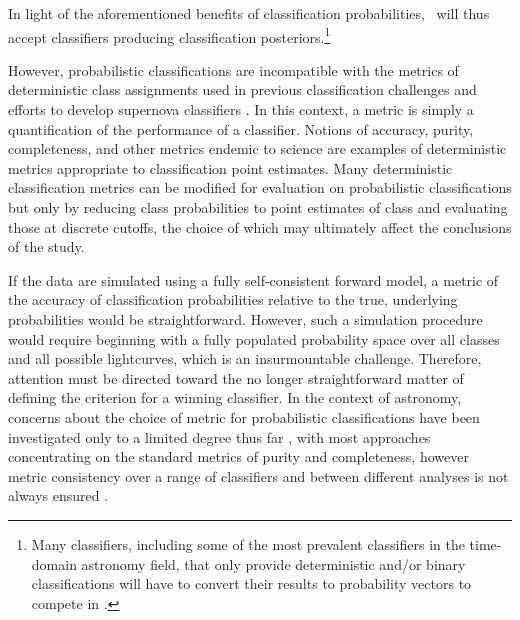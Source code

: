 In light of the aforementioned benefits of classification probabilities, \plasticc\ will thus accept classifiers producing classification posteriors.\footnote{Many classifiers, including some of the most prevalent classifiers in the time-domain astronomy field, that only provide deterministic and/or binary classifications will have to convert their results to probability vectors to compete in \plasticc.}

However, probabilistic classifications are incompatible with the metrics of deterministic class assignments used in previous classification challenges \citep{kessler_supernova_2010, kessler_results_2010} and efforts to develop supernova classifiers \citep{narayan_machine_2018}.
In this context, a metric is simply a quantification of the performance of a classifier.
Notions of accuracy, purity, completeness, and other metrics endemic to science are examples of deterministic metrics appropriate to classification point estimates.
Many deterministic classification metrics can be modified for evaluation on probabilistic classifications \citep{lochner_photometric_2016, moller_photometric_2016, hon_deep_2017, hon_detecting_2018, gieseke_detecting_2010} but only by reducing class probabilities to point estimates of class and evaluating those at discrete cutoffs, the choice of which may ultimately affect the conclusions of the study.

If the data are simulated using a fully self-consistent forward model, a metric of the accuracy of classification probabilities relative to the true, underlying probabilities would be straightforward.
However, such a simulation procedure would require beginning with a fully populated probability space over all classes and all possible lightcurves, which is an insurmountable challenge.
Therefore, attention must be directed toward the no longer straightforward matter of defining the criterion for a winning classifier.
In the context of astronomy, concerns about the choice of metric for probabilistic classifications have been investigated only to a limited degree thus far \citep{florios_forecasting_2018, kim_stargalaxy_2017},
with most approaches concentrating on the standard metrics of purity and completeness, however metric consistency over a range of classifiers and between different analyses is not always ensured \citep{bethapudi_separation_2018}.

